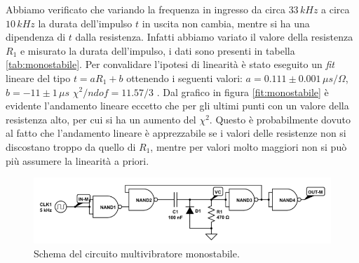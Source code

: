 \documentclass[10pt,a4paper]{article}
\begin{document}
Abbiamo verificato che variando la frequenza in ingresso da circa $33\,kHz$ a circa $10\,kHz$ la durata dell'impulso $t$ in uscita non cambia, mentre si ha una dipendenza di $t$ dalla resistenza. Infatti abbiamo variato il valore della resistenza $R_1$ e misurato la durata dell'impulso, i dati sono presenti in tabella \ref{tab:monostabile}. Per convalidare l'ipotesi di linearità è stato eseguito un \emph{fit} lineare del tipo $t=aR_1+b$ ottenendo i seguenti valori: $a=0.111\pm0.001\,\mu s/\Omega$, $b= -11\pm1\,\mu s$ $\chi^2/ndof=11.57/3$ . Dal grafico in figura \ref{fit:monostabile} è evidente l'andamento lineare eccetto che per gli ultimi punti con un valore della resistenza alto, per cui si ha un aumento del $\chi^2$. Questo è probabilmente dovuto al fatto che l'andamento lineare è apprezzabile se i valori delle resistenze non si discostano troppo da quello di $R_1$, mentre per valori molto maggiori non si può più assumere la linearità a priori.





\begin{figure}[!htb]
  \centering
  \includegraphics[scale=0.75]{monostabile.png}
\caption{Schema del circuito multivibratore monostabile.\label{fig:monostabile}}
\end{figure}
\end{document}
